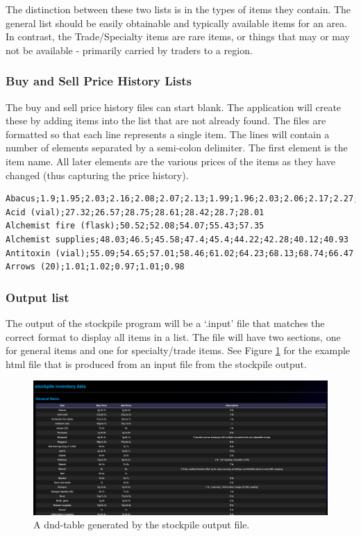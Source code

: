 The distinction between these two lists is in the types of items they contain. The general list should be easily obtainable and typically available items for an area. In contrast, the Trade/Specialty items are rare items, or things that may or may not be available - primarily carried by traders to a region.

\subsubsection{Buy and Sell Price History Lists \label{stockpile:buy and sell}}

The buy and sell price history files can start blank. The application will create these by adding items into the list that are not already found. The files are formatted so that each line represents a single item. The lines will contain a number of elements separated by a semi-colon delimiter. The first element is the item name. All later elements are the various prices of the items as they have changed (thus capturing the price history).

\begin{lstlisting}
Abacus;1.9;1.95;2.03;2.16;2.08;2.07;2.13;1.99;1.96;2.03;2.06;2.17;2.27;2.31
Acid (vial);27.32;26.57;28.75;28.61;28.42;28.7;28.01
Alchemist fire (flask);50.52;52.08;54.07;55.43;57.35
Alchemist supplies;48.03;46.5;45.58;47.4;45.4;44.22;42.28;40.12;40.93
Antitoxin (vial);55.09;54.65;57.01;58.46;61.02;64.23;68.13;68.74;66.47
Arrows (20);1.01;1.02;0.97;1.01;0.98
\end{lstlisting}

\subsubsection{Output list}

The output of the stockpile program will be a `.input' file that matches the correct format to display all items in a list. The file will have two sections, one for general items and one for specialty/trade items. See Figure \ref{fig:stockpile_general_list} for the example html file that is produced from an input file from the stockpile output.

\begin{figure}[h]
	\centering
	\includegraphics[width=\textwidth]{images/stockpile_general.png}
	\caption{A dnd-table generated by the stockpile output file.}
	\label{fig:stockpile_general_list}
\end{figure}

